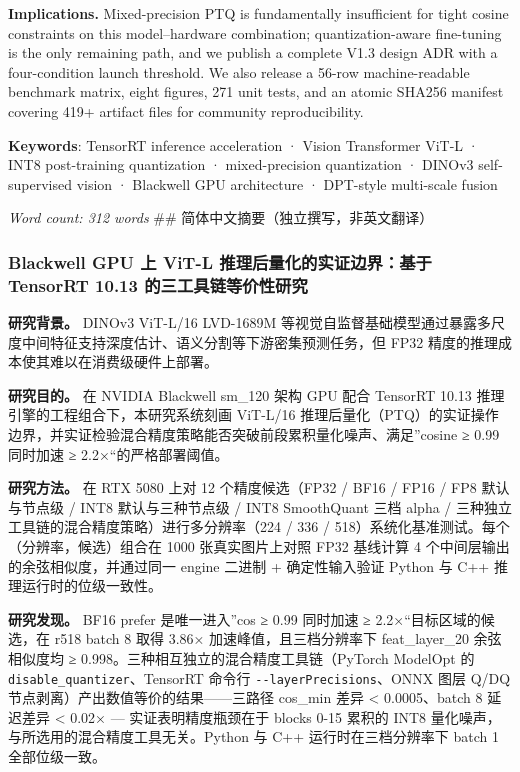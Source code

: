 \documentclass[
]{article}
\begin{document}
\textbf{Implications.} Mixed-precision PTQ is fundamentally insufficient
for tight cosine constraints on this model--hardware combination;
quantization-aware fine-tuning is the only remaining path, and we
publish a complete V1.3 design ADR with a four-condition launch
threshold. We also release a 56-row machine-readable benchmark matrix,
eight figures, 271 unit tests, and an atomic SHA256 manifest covering
419+ artifact files for community reproducibility.

\textbf{Keywords}: TensorRT inference acceleration · Vision Transformer
ViT-L · INT8 post-training quantization · mixed-precision quantization ·
DINOv3 self-supervised vision · Blackwell GPU architecture · DPT-style
multi-scale fusion

\emph{Word count: 312 words} \#\# 简体中文摘要（独立撰写，非英文翻译）

\subsubsection{Blackwell GPU 上 ViT-L 推理后量化的实证边界：基于
TensorRT 10.13
的三工具链等价性研究}\label{blackwell-gpu-ux4e0a-vit-l-ux63a8ux7406ux540eux91cfux5316ux7684ux5b9eux8bc1ux8fb9ux754cux57faux4e8e-tensorrt-10.13-ux7684ux4e09ux5de5ux5177ux94feux7b49ux4ef7ux6027ux7814ux7a76}

\textbf{研究背景。} DINOv3 ViT-L/16 LVD-1689M
等视觉自监督基础模型通过暴露多尺度中间特征支持深度估计、语义分割等下游密集预测任务，但
FP32 精度的推理成本使其难以在消费级硬件上部署。

\textbf{研究目的。} 在 NVIDIA Blackwell sm\_120 架构 GPU 配合 TensorRT
10.13 推理引擎的工程组合下，本研究系统刻画 ViT-L/16
推理后量化（PTQ）的实证操作边界，并实证检验混合精度策略能否突破前段累积量化噪声、满足''cosine
≥ 0.99 同时加速 ≥ 2.2×``的严格部署阈值。

\textbf{研究方法。} 在 RTX 5080 上对 12 个精度候选（FP32 / BF16 / FP16 /
FP8 默认与节点级 / INT8 默认与三种节点级 / INT8 SmoothQuant 三档 alpha /
三种独立工具链的混合精度策略）进行多分辨率（224 / 336 /
518）系统化基准测试。每个（分辨率，候选）组合在 1000 张真实图片上对照
FP32 基线计算 4 个中间层输出的余弦相似度，并通过同一 engine 二进制 +
确定性输入验证 Python 与 C++ 推理运行时的位级一致性。

\textbf{研究发现。} BF16 prefer 是唯一进入''cos ≥ 0.99 同时加速 ≥
2.2×``目标区域的候选，在 r518 batch 8 取得 3.86×
加速峰值，且三档分辨率下 feat\_layer\_20 余弦相似度均 ≥
0.998。三种相互独立的混合精度工具链（PyTorch ModelOpt 的
\texttt{disable\_quantizer}、TensorRT 命令行
\texttt{-\/-layerPrecisions}、ONNX 图层 Q/DQ
节点剥离）产出数值等价的结果------三路径 cos\_min 差异 \textless{}
0.0005、batch 8 延迟差异 \textless{} 0.02× --- 实证表明精度瓶颈在于
blocks 0-15 累积的 INT8 量化噪声，与所选用的混合精度工具无关。Python 与
C++ 运行时在三档分辨率下 batch 1 全部位级一致。
\end{document}
